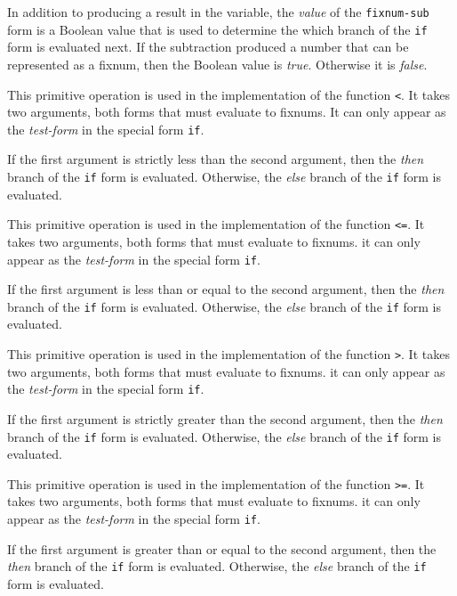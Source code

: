In addition to producing a result in the variable, the \emph{value}
of the \texttt{fixnum-sub} form is a Boolean value that is used to
determine the which branch of the \texttt{if} form is evaluated next.
If the subtraction produced a number that can be represented as a
fixnum, then the Boolean value is \emph{true}.  Otherwise it is
\emph{false}.

 {}

This primitive operation is used in the implementation of the
\commonlisp{} function \texttt{<}.  It takes two arguments, both forms
that must evaluate to fixnums.  It can only appear as the
\emph{test-form} in the special form \texttt{if}.

If the first argument is strictly less than the second argument, then
the \emph{then} branch of the \texttt{if} form is evaluated.
Otherwise, the \emph{else} branch of the \texttt{if} form is
evaluated.

 {}

This primitive operation is used in the implementation of the
\commonlisp{} function \texttt{<=}.  It takes two arguments, both
forms that must evaluate to fixnums.  it can only appear as the
\emph{test-form} in the special form \texttt{if}.

If the first argument is less than or equal to the second argument,
then the \emph{then} branch of the \texttt{if} form is evaluated.
Otherwise, the \emph{else} branch of the \texttt{if} form is
evaluated.

 {}

This primitive operation is used in the implementation of the
\commonlisp{} function \texttt{>}.  It takes two arguments, both
forms that must evaluate to fixnums.  it can only appear as the
\emph{test-form} in the special form \texttt{if}.

If the first argument is strictly greater than the second argument,
then the \emph{then} branch of the \texttt{if} form is evaluated.
Otherwise, the \emph{else} branch of the \texttt{if} form is
evaluated.

 {}

This primitive operation is used in the implementation of the
\commonlisp{} function \texttt{>=}.  It takes two arguments, both
forms that must evaluate to fixnums.  it can only appear as the
\emph{test-form} in the special form \texttt{if}.

If the first argument is greater than or equal to the second argument,
then the \emph{then} branch of the \texttt{if} form is evaluated.
Otherwise, the \emph{else} branch of the \texttt{if} form is
evaluated.

